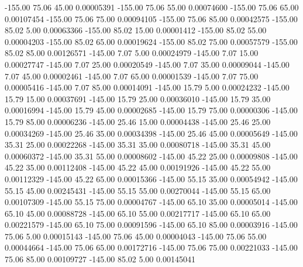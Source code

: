    -155.00     75.06     45.00     0.00005391
   -155.00     75.06     55.00     0.00074600
   -155.00     75.06     65.00     0.00107454
   -155.00     75.06     75.00     0.00094105
   -155.00     75.06     85.00     0.00042575
   -155.00     85.02      5.00     0.00063366
   -155.00     85.02     15.00     0.00001412
   -155.00     85.02     55.00     0.00004203
   -155.00     85.02     65.00     0.00019624
   -155.00     85.02     75.00     0.00057579
   -155.00     85.02     85.00     0.00126571
   -145.00      7.07      5.00     0.00024979
   -145.00      7.07     15.00     0.00027747
   -145.00      7.07     25.00     0.00020549
   -145.00      7.07     35.00     0.00009044
   -145.00      7.07     45.00     0.00002461
   -145.00      7.07     65.00     0.00001539
   -145.00      7.07     75.00     0.00005416
   -145.00      7.07     85.00     0.00014091
   -145.00     15.79      5.00     0.00024232
   -145.00     15.79     15.00     0.00037691
   -145.00     15.79     25.00     0.00036010
   -145.00     15.79     35.00     0.00016994
   -145.00     15.79     45.00     0.00002685
   -145.00     15.79     75.00     0.00000306
   -145.00     15.79     85.00     0.00006236
   -145.00     25.46     15.00     0.00004438
   -145.00     25.46     25.00     0.00034269
   -145.00     25.46     35.00     0.00034398
   -145.00     25.46     45.00     0.00005649
   -145.00     35.31     25.00     0.00022268
   -145.00     35.31     35.00     0.00080718
   -145.00     35.31     45.00     0.00060372
   -145.00     35.31     55.00     0.00008602
   -145.00     45.22     25.00     0.00009808
   -145.00     45.22     35.00     0.00112408
   -145.00     45.22     45.00     0.00191926
   -145.00     45.22     55.00     0.00112329
   -145.00     45.22     65.00     0.00015366
   -145.00     55.15     35.00     0.00054942
   -145.00     55.15     45.00     0.00245431
   -145.00     55.15     55.00     0.00270044
   -145.00     55.15     65.00     0.00107309
   -145.00     55.15     75.00     0.00004767
   -145.00     65.10     35.00     0.00005014
   -145.00     65.10     45.00     0.00088728
   -145.00     65.10     55.00     0.00217717
   -145.00     65.10     65.00     0.00221579
   -145.00     65.10     75.00     0.00091596
   -145.00     65.10     85.00     0.00003916
   -145.00     75.06      5.00     0.00015143
   -145.00     75.06     45.00     0.00004043
   -145.00     75.06     55.00     0.00044664
   -145.00     75.06     65.00     0.00172716
   -145.00     75.06     75.00     0.00221033
   -145.00     75.06     85.00     0.00109727
   -145.00     85.02      5.00     0.00145041
